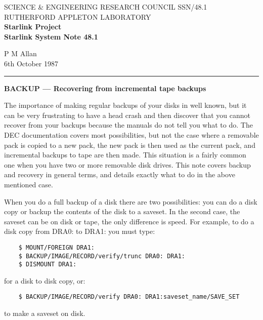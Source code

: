 \pagestyle{myheadings}
\setlength{\textwidth}{160mm}
\setlength{\textheight}{240mm}
\setlength{\topmargin}{-5mm}
\setlength{\oddsidemargin}{0mm}
\setlength{\evensidemargin}{0mm}
\setlength{\parindent}{0mm}
\setlength{\parskip}{\medskipamount}
\setlength{\unitlength}{1mm}


\thispagestyle{empty}
SCIENCE \& ENGINEERING RESEARCH COUNCIL \hfill SSN/48.1\\
RUTHERFORD APPLETON LABORATORY\\
{\large\bf Starlink Project\\}
{\large\bf Starlink System Note 48.1}
\begin{flushright}
P M Allan\\
6th October 1987
\end{flushright}
\vspace{-4mm}
\rule{\textwidth}{0.5mm}
\vspace{5mm}
\begin{center}
{\Large\bf BACKUP --- Recovering from incremental tape backups}
\end{center}
\vspace{5mm}

The importance of making regular backups of your disks in well known, but
it can be very frustrating to have a head crash and then discover that you
cannot recover from your backups because the manuals do not tell you what
to do.
The DEC documentation covers most possibilities, but not the case where a
removable pack is copied to a new pack, the new pack is then used as the
current pack, and incremental backups to tape are then made.
This situation is a fairly common one when you have two or more removable
disk drives.
This note covers backup and recovery in general terms, and details
exactly what to do in the above mentioned case.

When you do a full backup of a disk there are two possibilities: you can
do a disk copy or backup the contents of the disk to a saveset.
In the second case, the saveset can be on disk or tape, the only difference is
speed.
For example, to do a disk copy from DRA0: to DRA1: you must type:
\begin{verbatim}
    $ MOUNT/FOREIGN DRA1:
    $ BACKUP/IMAGE/RECORD/verify/trunc DRA0: DRA1:
    $ DISMOUNT DRA1:
\end{verbatim}
for a disk to disk copy, or:
\begin{verbatim}
    $ BACKUP/IMAGE/RECORD/verify DRA0: DRA1:saveset_name/SAVE_SET
\end{verbatim}
to make a saveset on disk.

